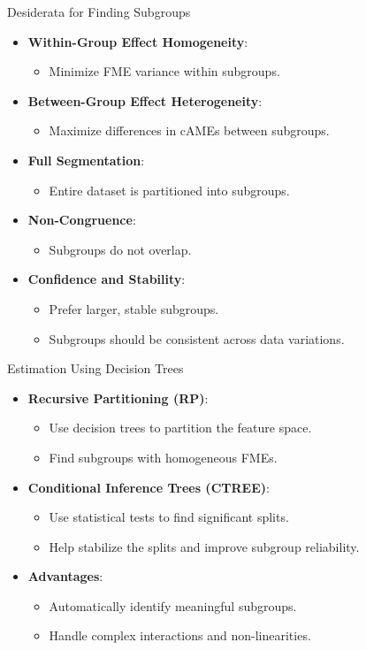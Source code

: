 \documentclass[11pt,compress,t,notes=noshow, aspectratio=169, xcolor=table]{beamer}
\begin{document}
\begin{frame}{Desiderata for Finding Subgroups}
\begin{itemize}
\item \textbf{Within-Group Effect Homogeneity}:
\begin{itemize}
\item Minimize FME variance within subgroups.
\end{itemize}
\item \textbf{Between-Group Effect Heterogeneity}:
\begin{itemize}
\item Maximize differences in cAMEs between subgroups.
\end{itemize}
\item \textbf{Full Segmentation}:
\begin{itemize}
\item Entire dataset is partitioned into subgroups.
\end{itemize}
\item \textbf{Non-Congruence}:
\begin{itemize}
\item Subgroups do not overlap.
\end{itemize}
\item \textbf{Confidence and Stability}:
\begin{itemize}
\item Prefer larger, stable subgroups.
\item Subgroups should be consistent across data variations.
\end{itemize}
\end{itemize}
\end{frame}

\begin{frame}{Estimation Using Decision Trees}
\begin{itemize}
\item \textbf{Recursive Partitioning (RP)}:
\begin{itemize}
\item Use decision trees to partition the feature space.
\item Find subgroups with homogeneous FMEs.
\end{itemize}
\item \textbf{Conditional Inference Trees (CTREE)}:
\begin{itemize}
\item Use statistical tests to find significant splits.
\item Help stabilize the splits and improve subgroup reliability.
\end{itemize}
\item \textbf{Advantages}:
\begin{itemize}
\item Automatically identify meaningful subgroups.
\item Handle complex interactions and non-linearities.
\end{itemize}
\end{itemize}
\end{frame}
\end{document}
